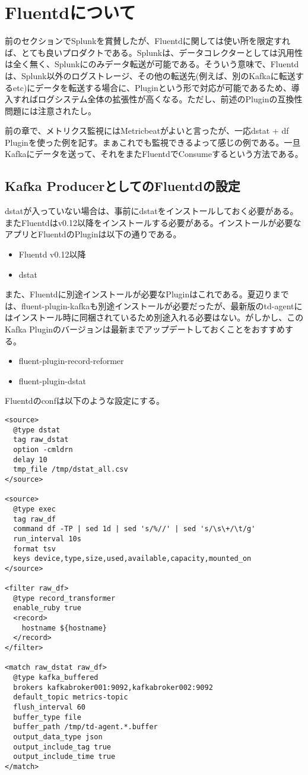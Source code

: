 \section{Fluentdについて}
前のセクションでSplunkを賞賛したが、Fluentdに関しては使い所を限定すれば、とても良いプロダクトである。Splunkは、データコレクターとしては汎用性は全く無く、Splunkにのみデータ転送が可能である。そういう意味で、Fluentdは、Splunk以外のログストレージ、その他の転送先(例えば、別のKafkaに転送するetc)にデータを転送する場合に、Pluginという形で対応が可能であるため、導入すればログシステム全体の拡張性が高くなる。ただし、前述のPluginの互換性問題には注意されたし。

前の章で、メトリクス監視にはMetricbeatがよいと言ったが、一応dstat + df Pluginを使った例を記す。まぁこれでも監視できるよって感じの例である。一旦Kafkaにデータを送って、それをまたFluentdでConsumeするという方法である。

\subsection{Kafka ProducerとしてのFluentdの設定}
dstatが入っていない場合は、事前にdstatをインストールしておく必要がある。またFluentdはv0.12以降をインストールする必要がある。インストールが必要なアプリとFluentdのPluginは以下の通りである。

\begin{itemize}
	\item Fluentd v0.12以降
	\item dstat
\end{itemize}

また、Fluentdに別途インストールが必要なPluginはこれである。夏辺りまでは、fluent-plugin-kafkaも別途インストールが必要だったが、最新版のtd-agentにはインストール時に同梱されているため別途入れる必要はない。がしかし、このKafka Pluginのバージョンは最新までアップデートしておくことをおすすめする。

\begin{itemize}
	\item fluent-plugin-record-reformer
	\item fluent-plugin-dstat
\end{itemize}

Fluentdのconfは以下のような設定にする。

\begin{lstlisting}
<source>
  @type dstat
  tag raw_dstat
  option -cmldrn
  delay 10
  tmp_file /tmp/dstat_all.csv
</source>

<source>
  @type exec
  tag raw_df
  command df -TP | sed 1d | sed 's/%//' | sed 's/\s\+/\t/g'
  run_interval 10s
  format tsv
  keys device,type,size,used,available,capacity,mounted_on
</source>

<filter raw_df>
  @type record_transformer
  enable_ruby true
  <record>
    hostname ${hostname}
  </record>
</filter>

<match raw_dstat raw_df>
  @type kafka_buffered
  brokers kafkabroker001:9092,kafkabroker002:9092
  default_topic metrics-topic
  flush_interval 60
  buffer_type file
  buffer_path /tmp/td-agent.*.buffer
  output_data_type json
  output_include_tag true
  output_include_time true
</match>
\end{lstlisting}

